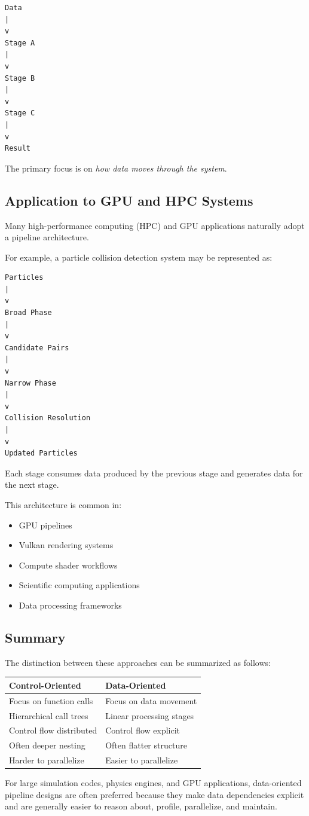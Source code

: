 \begin{verbatim}
Data
|
v
Stage A
|
v
Stage B
|
v
Stage C
|
v
Result
\end{verbatim}

The primary focus is on \emph{how data moves through the system}.

\subsection{Application to GPU and HPC Systems}

Many high-performance computing (HPC) and GPU applications naturally adopt a pipeline architecture.

For example, a particle collision detection system may be represented as:

\begin{verbatim}
Particles
|
v
Broad Phase
|
v
Candidate Pairs
|
v
Narrow Phase
|
v
Collision Resolution
|
v
Updated Particles
\end{verbatim}


Each stage consumes data produced by the previous stage and generates data for the next stage.

This architecture is common in:

\begin{itemize}
\item GPU pipelines
\item Vulkan rendering systems
\item Compute shader workflows
\item Scientific computing applications
\item Data processing frameworks
\end{itemize}

\subsection{Summary}

The distinction between these approaches can be summarized as follows:

\begin{center}
\begin{tabular}{|l|l|}
\hline
\textbf{Control-Oriented} & \textbf{Data-Oriented} \\
\hline
Focus on function calls & Focus on data movement \\
Hierarchical call trees & Linear processing stages \\
Control flow distributed & Control flow explicit \\
Often deeper nesting & Often flatter structure \\
Harder to parallelize & Easier to parallelize \\
\hline
\end{tabular}
\end{center}
For large simulation codes, physics engines, and GPU applications, data-oriented pipeline designs are often preferred because they make data dependencies explicit and are generally easier to reason about, profile, parallelize, and maintain.


